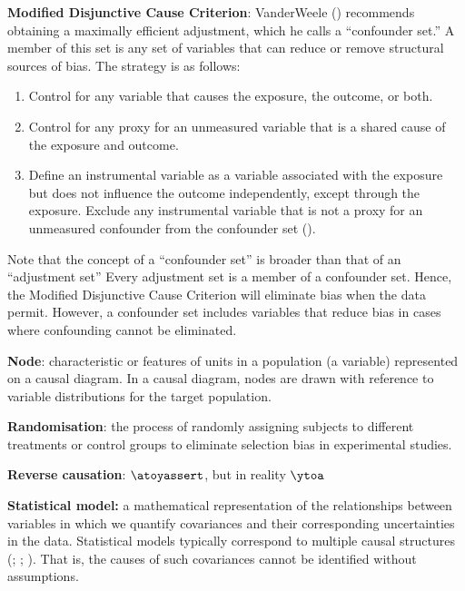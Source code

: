 \documentclass[
  singlecolumn]{article}
\providecommand{\tightlist}{%
  \setlength{\itemsep}{0pt}\setlength{\parskip}{0pt}}\usepackage{longtable,booktabs,array}
\begin{document}
\textbf{Modified Disjunctive Cause Criterion}: VanderWeele
() recommends obtaining a maximally
efficient adjustment, which he calls a ``confounder set.'' A member of
this set is any set of variables that can reduce or remove structural
sources of bias. The strategy is as follows:

\begin{enumerate}
\def\labelenumi{\alph{enumi}.}
\tightlist
\item
  Control for any variable that causes the exposure, the outcome, or
  both.
\item
  Control for any proxy for an unmeasured variable that is a shared
  cause of the exposure and outcome.
\item
  Define an instrumental variable as a variable associated with the
  exposure but does not influence the outcome independently, except
  through the exposure. Exclude any instrumental variable that is not a
  proxy for an unmeasured confounder from the confounder set
  ().
\end{enumerate}

Note that the concept of a ``confounder set'' is broader than that of an
``adjustment set'' Every adjustment set is a member of a confounder set.
Hence, the Modified Disjunctive Cause Criterion will eliminate bias when
the data permit. However, a confounder set includes variables that
reduce bias in cases where confounding cannot be eliminated.

\textbf{Node}: characteristic or features of units in a population (a
variable) represented on a causal diagram. In a causal diagram, nodes
are drawn with reference to variable distributions for the target
population.

\textbf{Randomisation}: the process of randomly assigning subjects to
different treatments or control groups to eliminate selection bias in
experimental studies.

\textbf{Reverse causation}: \(\atoyassert\), but in reality \(\ytoa\)

\textbf{Statistical model:} a mathematical representation of the
relationships between variables in which we quantify covariances and
their corresponding uncertainties in the data. Statistical models
typically correspond to multiple causal structures
(;
;
).
That is, the causes of such covariances cannot be identified without
assumptions.
\end{document}
